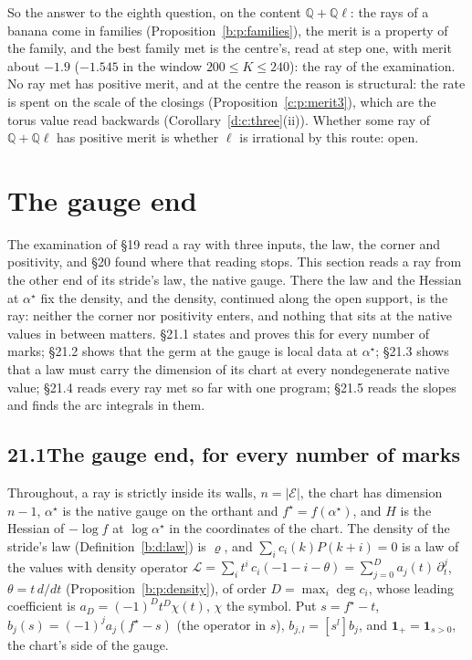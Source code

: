 \documentclass[11pt]{article}
\newcommand{\cE}{\mathcal E}
\newcommand{\one}{\mathbf 1}
\theoremstyle{plain}
\theoremstyle{definition}
\theoremstyle{remark}
\renewcommand{\thesection}{15}
\renewcommand{\theproposition}{15.\arabic{proposition}}
\begin{document}
\noindent So the answer to the eighth question, on the content $\mathbb Q+\mathbb Q\ell$: the rays of a banana come in families (Proposition~\ref{b:p:families}), the merit is a property of the family, and the best family met is the centre's, read at step one, with merit about $-1.9$ ($-1.545$ in the window $200\le K\le240$): the ray of the examination. No ray met has positive merit, and at the centre the reason is structural: the rate is spent on the scale of the closings (Proposition~\ref{c:p:merit3}), which are the torus value read backwards (Corollary~\ref{d:c:three}(ii)). Whether some ray of $\mathbb Q+\mathbb Q\ell$ has positive merit is whether $\ell$ is irrational by this route: open.

\renewcommand{\thesection}{21}
\setcounter{proposition}{0}
\renewcommand{\theproposition}{21.\arabic{proposition}}

\section{The gauge end}

The examination of \S19 read a ray with three inputs, the law, the corner and positivity, and \S20 found where that reading stops. This section reads a ray from the other end of its stride's law, the native gauge. There the law and the Hessian at $\alpha^\star$ fix the density, and the density, continued along the open support, is the ray: neither the corner nor positivity enters, and nothing that sits at the native values in between matters. \S21.1 states and proves this for every number of marks; \S21.2 shows that the germ at the gauge is local data at $\alpha^\star$; \S21.3 shows that a law must carry the dimension of its chart at every nondegenerate native value; \S21.4 reads every ray met so far with one program; \S21.5 reads the slopes and finds the arc integrals in them.

\subsection*{21.1\quad The gauge end, for every number of marks}

Throughout, a ray is strictly inside its walls, $n=|\cE|$, the chart has dimension $n-1$, $\alpha^\star$ is the native gauge on the orthant and $f^\star=f(\alpha^\star)$, and $H$ is the Hessian of $-\log f$ at $\log\alpha^\star$ in the coordinates of the chart. The density of the stride's law (Definition~\ref{b:d:law}) is $\varrho$, and $\sum_ic_i(k)P(k+i)=0$ is a law of the values with density operator $\mathcal L=\sum_it^i\,c_i(-1-i-\theta)=\sum_{j=0}^Da_j(t)\,\partial_t^j$, $\theta=t\,d/dt$ (Proposition~\ref{b:p:density}), of order $D=\max_i\deg c_i$, whose leading coefficient is $a_D=(-1)^Dt^D\chi(t)$, $\chi$ the symbol. Put $s=f^\star-t$, $b_j(s)=(-1)^ja_j(f^\star-s)$ (the operator in $s$), $b_{j,l}=[s^l]b_j$, and $\one_+=\one_{s>0}$, the chart's side of the gauge.
\end{document}
